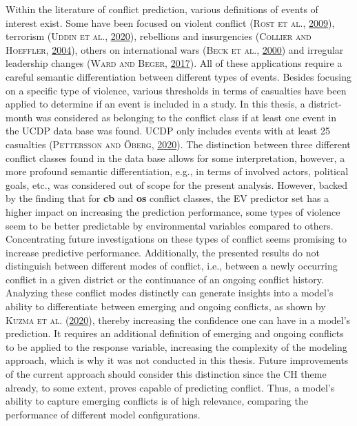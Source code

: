 \documentclass[a4paper,11pt]{article}
\begin{document}
Within the literature of conflict prediction, various definitions of events of
interest exist. Some have been focused on violent conflict \textsc{(\textnormal{\textsc{Rost} \textsc{et al.}}, \textnormal{\protect\hyperlink{ref-rost2009}{2009}})}, terrorism
\textsc{(\textnormal{\textsc{Uddin} \textsc{et al.}}, \textnormal{\protect\hyperlink{ref-uddin2020}{2020}})}, rebellions and insurgencies \textsc{(\textnormal{\textsc{Collier} and \textsc{Hoeffler}}, \textnormal{\protect\hyperlink{ref-collier2004}{2004}})}, others on international
wars \textsc{(\textnormal{\textsc{Beck} \textsc{et al.}}, \textnormal{\protect\hyperlink{ref-beck2000}{2000}})} and irregular leadership changes \textsc{(\textnormal{\textsc{Ward} and \textsc{Beger}}, \textnormal{\protect\hyperlink{ref-ward2017}{2017}})}. All of these
applications require a careful semantic differentiation between different types
of events. Besides focusing on a specific type of violence, various thresholds
in terms of casualties have been applied to determine if an event is included in
a study. In this thesis, a district-month was considered as belonging to the
conflict class if at least one event in the UCDP data base was found. UCDP only
includes events with at least 25 casualties \textsc{(\textnormal{\textsc{Pettersson} and \textsc{Öberg}}, \textnormal{\protect\hyperlink{ref-pettersson2020}{2020}})}. The distinction
between three different conflict classes found in the data base allows for some
interpretation, however, a more profound semantic differentiation, e.g., in terms of involved
actors, political goals, etc., was considered out of scope for the present analysis.
However, backed by the finding that for \textbf{cb} and \textbf{os} conflict classes, the
EV predictor set has a higher impact on increasing the prediction performance,
some types of violence seem to be better predictable by environmental variables
compared to others. Concentrating future investigations on these types of conflict
seems promising to increase predictive performance. Additionally, the presented
results do not distinguish between different modes of conflict, i.e., between a
newly occurring conflict in a given district or the continuance of an ongoing
conflict history. Analyzing these conflict modes distinctly can generate insights
into a model's ability to differentiate between emerging and ongoing conflicts,
as shown by \textsc{\textnormal{Kuzma} \textnormal{et al.}} \textsc{(\textnormal{\protect\hyperlink{ref-kuzma2020}{2020}})}, thereby increasing the confidence one can have in a model's
prediction. It requires an additional definition of emerging and ongoing conflicts
to be applied to the response variable, increasing the complexity of the modeling
approach, which is why it was not conducted in this thesis. Future improvements
of the current approach should consider this distinction since the CH theme
already, to some extent, proves capable of predicting conflict. Thus, a model's
ability to capture emerging conflicts is of high relevance, comparing the
performance of different model configurations.
\end{document}
